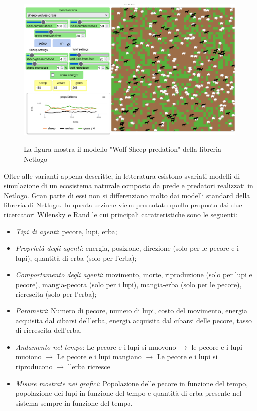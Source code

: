\documentclass[11pt]{article}
\begin{document}
\begin{figure}[h]
    \centering
    \includegraphics[scale = 0.5]{modelloNetLogo.png}
    \label{fig:ModelloNetlogo}
    \caption{La figura mostra il modello "Wolf Sheep predation" della libreria Netlogo}
\end{figure}

Oltre alle varianti appena descritte, in letteratura esistono svariati modelli di simulazione di un ecosistema naturale composto da prede e predatori realizzati in Netlogo. Gran parte di essi non si differenziano molto dai modelli standard della libreria di Netlogo. In questa sezione viene presentato quello proposto dai due ricercatori Wilensky e Rand\cite{WilenskyRand} le cui principali caratteristiche sono le seguenti: 

\begin{itemize}
    \item \emph{Tipi di agenti}: pecore, lupi, erba;
    \item \emph{Proprietà degli agenti}: energia, posizione, direzione (solo per le pecore e i lupi), quantità di erba (solo per l'erba);
    \item \emph{Comportamento degli agenti}: movimento, morte, riproduzione (solo per lupi e pecore), mangia-pecora (solo per i lupi), mangia-erba (solo per le pecore), ricrescita (solo per l'erba);
    \item \emph{Parametri}: Numero di pecore, numero di lupi, costo del movimento, energia acquisita dal cibarsi dell'erba, energia acquisita dal cibarsi delle pecore, tasso di ricrescita dell'erba.
    \item \emph{Andamento nel tempo}: Le pecore e i lupi si muovono $\rightarrow$ le pecore e i lupi muoiono $\rightarrow$ Le pecore e i lupi mangiano $\rightarrow$ Le pecore e i lupi si riproducono $\rightarrow$ l'erba ricresce
    \item \emph{Misure mostrate nei grafici}: Popolazione delle pecore in funzione del tempo, popolazione dei lupi in funzione del tempo e quantità di erba presente nel sistema sempre in funzione del tempo. 
\end{itemize}
\end{document}
